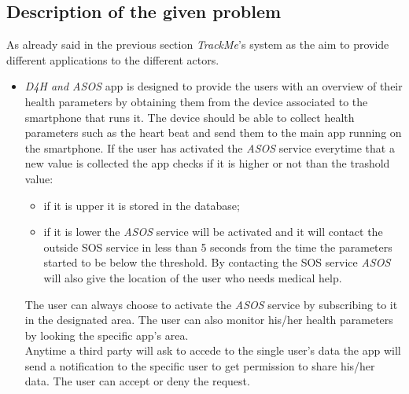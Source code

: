 \subsection{Description of the given problem}

As already said in the previous section \textit{TrackMe}'s system as the aim to provide different applications to the different actors.
\begin{itemize}
	\item {\textit{D4H and ASOS} app is designed to provide the users with an overview of their health parameters by obtaining them from the device associated to the smartphone that runs it. The device should be able to collect health parameters such as the heart beat and send them to the main app running on the smartphone. If the user has activated the \textit{ASOS} service everytime that a new value is collected the app checks if it is higher or not than the trashold value:
		\begin{itemize}
			\item {if it is upper it is stored in the database;}
			\item {if it is lower the \textit{ASOS} service will be activated and it will contact the outside SOS service in less than 5 seconds from the time the parameters started to be below the threshold. By contacting the SOS service \textit{ASOS} will also give the location of the user who needs medical help.}
		\end{itemize}
		The user can always choose to activate the \textit{ASOS} service by subscribing to it in the designated area. The user can also monitor his/her health parameters by looking the specific app's area.\\
		Anytime a third party will ask to accede to the single user's data the app will send a notification to the specific user to get permission to share his/her data. The user can accept or deny the request.}


\end{itemize}
